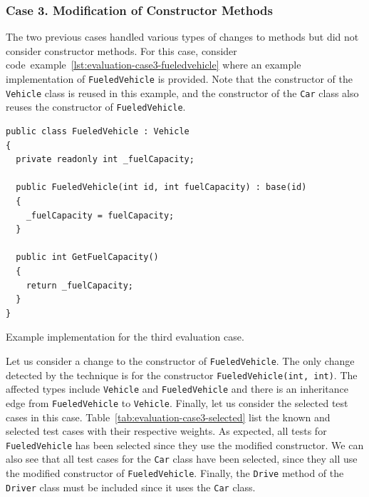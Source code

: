 \documentclass[a4paper,english,12pt]{report}
\newcommand{\textcf}{\texttt}
\begin{document}
\subsubsection{Case 3. Modification of Constructor Methods}
The two previous cases handled various types of changes to methods but did not consider constructor methods. For this case, consider code~example~\vref{lst:evaluation-case3-fueledvehicle} where an example implementation of \textcf{FueledVehicle} is provided. Note that the constructor of the \textcf{Vehicle} class is reused in this example, and the constructor of the \textcf{Car} class also reuses the constructor of \textcf{FueledVehicle}.

\begin{listing}[htbp]
{\footnotesize
\begin{verbatim}
public class FueledVehicle : Vehicle
{
  private readonly int _fuelCapacity;

  public FueledVehicle(int id, int fuelCapacity) : base(id)
  {
    _fuelCapacity = fuelCapacity;
  }

  public int GetFuelCapacity()
  {
    return _fuelCapacity;
  }
}
\end{verbatim}
}
\caption{Example implementation for the third evaluation case.}
\label{lst:evaluation-case3-fueledvehicle}
\end{listing}

Let us consider a change to the constructor of \textcf{FueledVehicle}. The only change detected by the technique is for the constructor \textcf{FueledVehicle(int, int)}. The affected types include \textcf{Vehicle} and \textcf{FueledVehicle} and there is an inheritance edge from \textcf{FueledVehicle} to \textcf{Vehicle}. Finally, let us consider the selected test cases in this case. Table~\vref{tab:evaluation-case3-selected} list the known and selected test cases with their respective weights. As expected, all tests for \textcf{FueledVehicle} has been selected since they use the modified constructor. We can also see that all test cases for the \textcf{Car} class have been selected, since they all use the modified constructor of \textcf{FueledVehicle}. Finally, the \textcf{Drive} method of the \textcf{Driver} class must be included since it uses the \textcf{Car} class.
\end{document}
